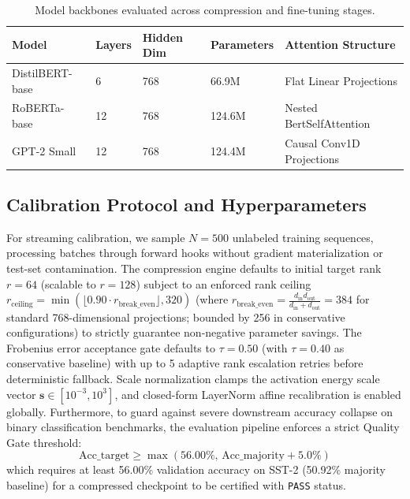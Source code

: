 \begin{table}[H]
\centering
\small
\begin{tabular}{lllll}
\toprule
\textbf{Model} & \textbf{Layers} & \textbf{Hidden Dim} & \textbf{Parameters} & \textbf{Attention Structure} \\
\midrule
DistilBERT-base & 6  & 768 & 66.9M  & Flat Linear Projections \\
RoBERTa-base    & 12 & 768 & 124.6M & Nested BertSelfAttention \\
GPT-2 Small     & 12 & 768 & 124.4M & Causal Conv1D Projections \\
\bottomrule
\end{tabular}
\caption{Model backbones evaluated across compression and fine-tuning stages.}
\label{tab:setup_models}
\end{table}

\subsection{Calibration Protocol and Hyperparameters}
\label{sec:setup_calibration}

For streaming calibration, we sample $N = 500$ unlabeled training sequences, processing batches through forward hooks without gradient materialization or test-set contamination. The compression engine defaults to initial target rank $r = 64$ (scalable to $r=128$) subject to an enforced rank ceiling $r_{\mathrm{ceiling}} = \min(\lfloor 0.90 \cdot r_{\mathrm{break\_even}}\rfloor, 320)$ (where $r_{\mathrm{break\_even}} = \frac{d_{\mathrm{in}} d_{\mathrm{out}}}{d_{\mathrm{in}} + d_{\mathrm{out}}} = 384$ for standard 768-dimensional projections; bounded by 256 in conservative configurations) to strictly guarantee non-negative parameter savings. The Frobenius error acceptance gate defaults to $\tau = 0.50$ (with $\tau = 0.40$ as conservative baseline) with up to 5 adaptive rank escalation retries before deterministic fallback. Scale normalization clamps the activation energy scale vector $\mathbf{s} \in [10^{-3}, 10^{3}]$, and closed-form LayerNorm affine recalibration is enabled globally. Furthermore, to guard against severe downstream accuracy collapse on binary classification benchmarks, the evaluation pipeline enforces a strict Quality Gate threshold:
\[
\mathrm{Acc}\_{\mathrm{target}} \ge \max(56.00\%,\, \mathrm{Acc}\_{\mathrm{majority}} + 5.0\%)
\tag{6.1}
\]
which requires at least 56.00\% validation accuracy on SST-2 (50.92\% majority baseline) for a compressed checkpoint to be certified with \texttt{PASS} status.

